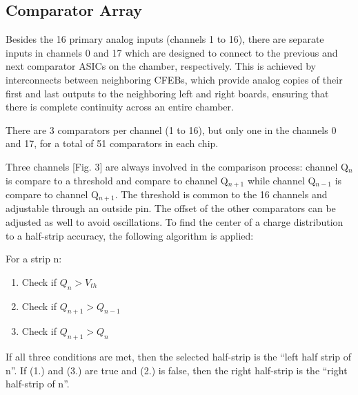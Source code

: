 \documentclass[letterpaper]{article}
\begin{document}
\subsection{Comparator Array}\label{sec:comparator-array}

Besides the 16 primary analog inputs (channels 1 to 16), there are separate inputs in channels 0 and 17 which are designed to connect to the previous and next comparator ASICs on the chamber, respectively. This is achieved by interconnects between neighboring CFEBs, which provide analog copies of their first and last outputs to the neighboring left and right boards, ensuring that there is complete continuity across an entire chamber.

There are 3 comparators per channel (1 to 16), but only one in the channels 0 and 17, for a total of 51 comparators in each chip.

Three channels [Fig. 3] are always involved in the comparison process: channel Q$_n$ is compare to a threshold and compare to channel Q$_{n+1}$ while channel Q$_{n-1}$ is compare to channel Q$_{n+1}$. The threshold is common to the 16 channels and adjustable through an outside pin. The offset of the other comparators can be adjusted as well to avoid oscillations.  To find the center of a charge distribution to a half-strip accuracy, the following algorithm is applied:

For a strip n:

\begin{enumerate}
    \item  Check if $Q_n > V_{th}$
    \item  Check if $Q_{n+1} > Q_{n-1}$
    \item  Check if $Q_{n+1} > Q_{n}$
\end{enumerate}

If all three conditions are met, then the selected half-strip is the ``left half strip of n''.  If (1.) and (3.) are true and (2.) is false, then the right half-strip is the ``right half-strip of n''.
\end{document}
